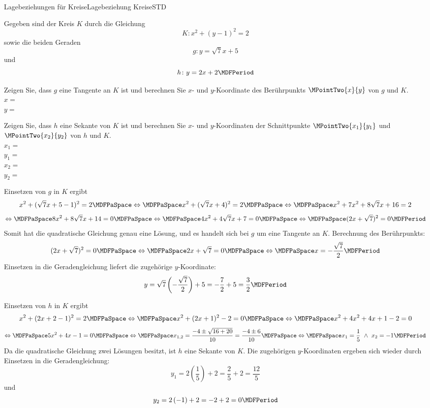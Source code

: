 \begin{MXContent}{Lagebeziehungen für Kreise}{Lagebeziehung Kreise}{STD}
\begin{MExercise}
Gegeben sind der Kreis $K$ durch die Gleichung
\[
 K\colon x^2+(y-1)^2=2
\]
sowie die beiden Geraden
\[
 g\colon y=\sqrt{7}x+5
\]
und
\[
 h\colon y=2x+2 \MDFPeriod 
\]
\begin{MExerciseItems}
\item{Zeigen Sie, dass $g$ eine Tangente an $K$ ist und berechnen Sie $x$- und $y$-Koordinate des Berührpunkts $\MPointTwo{x}{y}$ von $g$ und $K$.\\
$x=$\\
$y=$
} 
\item{Zeigen Sie, dass $h$ eine Sekante von $K$ ist und berechnen Sie $x$- und $y$-Koordinaten der Schnittpunkte $\MPointTwo{x_1}{y_1}$ und $\MPointTwo{x_2}{y_2}$ von $h$ und $K$.\\
$x_1=$\\
$y_1=$\\
$x_2=$\\
$y_2=$
} 
\end{MExerciseItems}

\begin{MHint}{\iSolution}
\begin{MExerciseItems}
\item{Einsetzen von $g$ in $K$ ergibt
\[
 x^2+(\sqrt{7}x+5-1)^2=2\MDFPaSpace\Leftrightarrow\MDFPaSpace x^2+(\sqrt{7}x+4)^2=2\MDFPaSpace\Leftrightarrow\MDFPaSpace x^2+7x^2+8\sqrt{7}x+16=2
\]
\[
 \Leftrightarrow\MDFPaSpace 8x^2+8\sqrt{7}x+14=0\MDFPaSpace\Leftrightarrow\MDFPaSpace 4x^2+4\sqrt{7}x+7=0\MDFPaSpace\Leftrightarrow\MDFPaSpace (2x+\sqrt{7})^2=0 \MDFPeriod
\]
Somit hat die quadratische Gleichung genau eine Lösung, und es handelt sich bei $g$ um eine Tangente an $K$. Berechnung des Berührpunkts:
\[
 (2x+\sqrt{7})^2=0\MDFPaSpace\Leftrightarrow\MDFPaSpace 2x+\sqrt{7}=0\MDFPaSpace\Leftrightarrow\MDFPaSpace x=-\frac{\sqrt{7}}{2}\MDFPeriod
\]
Einsetzen in die Geradengleichung liefert die zugehörige $y$-Koordinate:
\[
 y=\sqrt{7}\left(-\frac{\sqrt{7}}{2}\right)+5=-\frac{7}{2}+5=\frac{3}{2}\MDFPeriod
\]
}
\item{Einsetzen von $h$ in $K$ ergibt
\[
 x^2+(2x+2-1)^2=2\MDFPaSpace\Leftrightarrow\MDFPaSpace x^2+(2x+1)^2-2=0\MDFPaSpace\Leftrightarrow\MDFPaSpace x^2+4x^2+4x+1-2=0
\]
\[
 \Leftrightarrow\MDFPaSpace 5x^2+4x-1=0\MDFPaSpace\Leftrightarrow\MDFPaSpace x_{1,2}=\frac{-4\pm\sqrt{16+20}}{10}=\frac{-4\pm 6}{10}\MDFPaSpace\Leftrightarrow\MDFPaSpace
 x_1=\frac{1}{5}\ \wedge\ x_2=-1 \MDFPeriod
\]
Da die quadratische Gleichung zwei Lösungen besitzt, ist $h$ eine Sekante von $K$. Die zugehörigen $y$-Koordinaten ergeben sich wieder durch Einsetzen in die Geradengleichung:
\[
 y_1=2\left(\frac{1}{5}\right)+2=\frac{2}{5}+2=\frac{12}{5}
\]
und 
\[
 y_2=2\left(-1\right)+2=-2+2=0\MDFPeriod
\]

}
\end{MExerciseItems}
\end{MHint}
\end{MExercise}
\end{MXContent}
